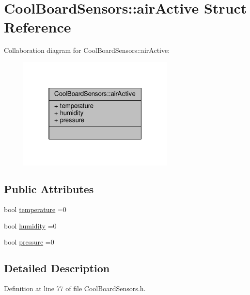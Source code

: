 \hypertarget{struct_cool_board_sensors_1_1air_active}{}\section{Cool\+Board\+Sensors\+:\+:air\+Active Struct Reference}
\label{struct_cool_board_sensors_1_1air_active}


Collaboration diagram for Cool\+Board\+Sensors\+:\+:air\+Active\+:\nopagebreak
\begin{figure}[H]
\begin{center}
\leavevmode
\includegraphics[width=223pt]{d5/d30/struct_cool_board_sensors_1_1air_active__coll__graph}
\end{center}
\end{figure}
\subsection*{Public Attributes}
\begin{DoxyCompactItemize}
\item 
bool \hyperlink{struct_cool_board_sensors_1_1air_active_ac08576736c7ac3bfbfec32e5ee17c686}{temperature} =0
\item 
bool \hyperlink{struct_cool_board_sensors_1_1air_active_ab69738e9fd1c2ba80dc666bcd1e116f7}{humidity} =0
\item 
bool \hyperlink{struct_cool_board_sensors_1_1air_active_a15932ccfb6ee6603713d937ec9b76b72}{pressure} =0
\end{DoxyCompactItemize}


\subsection{Detailed Description}


Definition at line 77 of file Cool\+Board\+Sensors.\+h.



